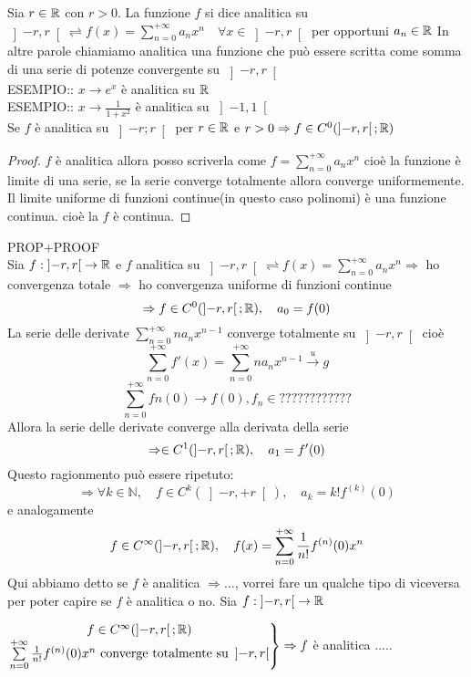Sia $r\in \mathbb{R}$ con $r>0$. La funzione $f$ si dice analitica su $\left]-r,r\right[ \rightleftharpoons f(x)=\sum\limits_{n=0}^{+\infty}a_nx^n \quad \forall x\in\left]-r,r\right[$ per opportuni $a_n\in \mathbb{R}$
\observation
In altre parole chiamiamo analitica una funzione che può essere scritta come somma di una serie di potenze convergente su $\left]-r,r\right[$ \\
ESEMPIO:: $x\to e^x$ è analitica su $ \mathbb{R}$\\
ESEMPIO:: $x\to\frac{1}{1+x^2}$ è analitica su $\left]-1,1\right[$\\
\proposition
Se $f$ è analitica su $\left]-r;r\right[$ per $r\in \mathbb{R}$ e $r>0\Rightarrow f\in C^0(\left]-r,r\right[; \mathbb{R})$
\begin{proof}
	$f$ è analitica  allora posso scriverla come $f=\sum\limits_{n=0}^{+\infty}a_nx^n$ cioè la funzione è limite di una serie, se la serie converge totalmente allora converge uniformemente. Il limite uniforme di funzioni continue(in questo caso polinomi) è una funzione continua. cioè la $f$ è continua.
\end{proof}
\proposition PROP+PROOF\\
Sia $f:\left]-r,r\right[\to \mathbb{R}$ e $f$ analitica su $\left]-r,r\right[ \rightleftharpoons f(x)=\sum\limits_{n=0}^{+\infty}a_nx^n \Rightarrow$ ho convergenza totale $\Rightarrow$ ho convergenza uniforme di funzioni continue 
$$\Rightarrow f\in C^0(\left]-r,r\right[; \mathbb{R}),\quad a_0=f(0)$$
La serie delle derivate $\sum\limits_{n=0}^{+\infty}na_nx^{n-1}$ converge totalmente su $\left]-r,r\right[$ cioè
$$\sum\limits_{n=0}^{+\infty}f'(x)=\sum\limits_{n=0}^{+\infty}na_nx^{n-1}\overset{u}{\to}g$$
$$\sum\limits_{n=0}^{+\infty}fn(0)\to f(0), f_n\in ????????????$$ 
Allora la serie delle derivate converge alla derivata della serie 
$$\Rightarrow \in C^1(\left]-r,r\right[; \mathbb{R}),\quad a_1=f'(0)$$ 
Questo ragionmento può essere ripetuto:
$$\Rightarrow \forall k\in\mathbb{N},\quad f\in C^k(\left]-r,+r\right[),\quad a_k=k!f^{(k)}(0)$$
e analogamente
$$f\in C^{\infty}(\left]-r,r\right[; \mathbb{R}),\quad f(x)=\sum\limits_{n=0}^{+\infty}\frac{1}{n!}f^{(n)}(0)x^n$$
\observation Qui abbiamo detto se $f$ è analitica $\Rightarrow \ldots$, vorrei fare un qualche tipo di viceversa per poter capire se $f$ è analitica o no.
\proposition
Sia $f:\left]-r,r\right[\to \mathbb{R}$
\begin{center}
	$\left.\begin{matrix}
	f\in C^{\infty}(\left]-r,r\right[; \mathbb{R})\\
	\sum\limits_{n=0}^{+\infty}\frac{1}{n!}f^{(n)}(0)x^n\text{ converge totalmente su } \left]-r,r\right[\\
	\end{matrix}\right\}\Rightarrow f$ è analitica  .....
\end{center}
